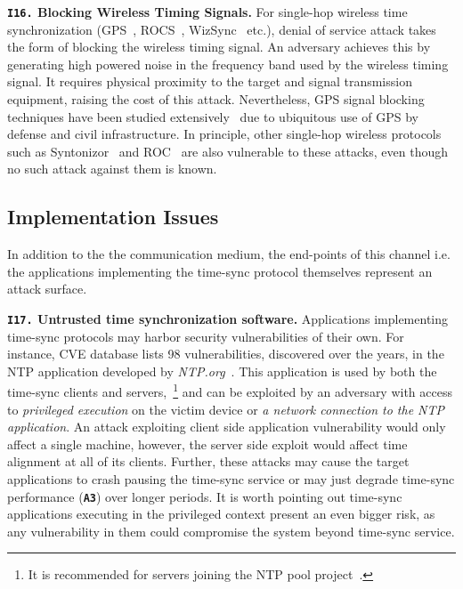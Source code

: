 \noindent\textbf{\texttt{I16.} Blocking Wireless Timing Signals.} For single-hop wireless time synchronization (GPS~\cite{gps-spoofing-fundamentals}, ROCS~\cite{ROCS-FM-Beacons}, WizSync~\cite{WizSync-Wifi-Beacons} etc.), denial of service attack takes the form of blocking the wireless timing signal. An adversary achieves this by generating high powered noise in the frequency band used by the wireless timing signal. It requires physical proximity to the target and signal transmission equipment, raising the cost of this attack. Nevertheless, GPS signal blocking techniques have been studied extensively~\cite{gps-jamming-overview} due to ubiquitous use of GPS by defense and civil infrastructure. In principle, other single-hop wireless protocols such as Syntonizor~\cite{Syntonizor-AC-powerlines} and ROC~\cite{ROCS-FM-Beacons} are also vulnerable to these attacks, even though no such attack against them is known.

\subsection{Implementation Issues} In addition to the the communication medium, the end-points of this channel i.e. the applications implementing the time-sync protocol themselves represent an attack surface.

\noindent\textbf{\texttt{I17.} Untrusted time synchronization software.} Applications implementing time-sync protocols may harbor security vulnerabilities of their own. For instance, CVE database lists 98 vulnerabilities, discovered over the years, in the NTP application developed by \textit{NTP.org}~\cite{ntp-cve-details}. This application is used by both the time-sync clients and servers,~\footnote{It is recommended for servers joining the NTP pool project~\cite{ntpd-pool-project}.} and can be exploited by an adversary with access to \textit{privileged execution} on the victim device or \textit{a network connection to the NTP application}. An attack exploiting client side application vulnerability would only affect a single machine, however, the server side exploit would affect time alignment at all of its clients. Further, these attacks may cause the target applications to crash pausing the time-sync service or may just degrade time-sync performance (\textbf{\texttt{A3}}) over longer periods. It is worth pointing out time-sync applications executing in the privileged context present an even bigger risk, as any vulnerability in them could compromise the system beyond time-sync service.